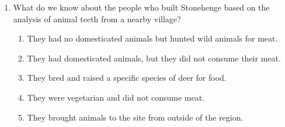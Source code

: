 \documentclass[12pt]{article}
\begin{document}
\begin{enumerate}[label=\arabic*.]
\begin{enumerate}[label=(\alph*)]
    \item Sunda; Sahul
    \item Sunda; Wallacea
    \item Gondwana; Beringia
    \item Sunda; Gondwana
    \item Beringia; Sunda
\end{enumerate}
\item What do we know about the people who built Stonehenge based on the analysis of animal teeth from a nearby village?
\begin{enumerate}[label=(\alph*)]
    \item They had no domesticated animals but hunted wild animals for meat.
    \item They had domesticated animals, but they did not consume their meat.
    \item They bred and raised a specific species of deer for food.
    \item They were vegetarian and did not consume meat.
    \item They brought animals to the site from outside of the region.
\end{enumerate}
\end{enumerate}
\end{document}
